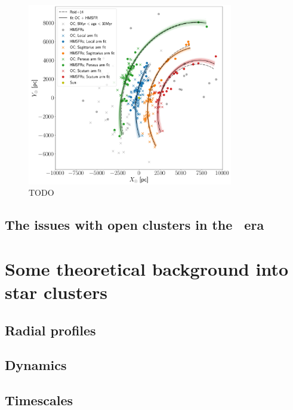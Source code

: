 \begin{figure}[tb]
	\centering
	\includegraphics[width=0.8\textwidth]{fig/c1/spiral_arms.png}
	\caption[TODO]{TODO}
	\label{fig:intro:gaia:spiral}
\end{figure}


\subsection{The issues with open clusters in the \gaia\ era}
\label{sec:intro:gaia:issues}


\section{Some theoretical background into star clusters}
\label{sec:intro:theory}

\subsection{Radial profiles}
\label{sec:intro:theory:profile}


\subsection{Dynamics}
\label{sec:intro:theory:dynamics}


\subsection{Timescales}
\label{sec:intro:theory:timescales}


